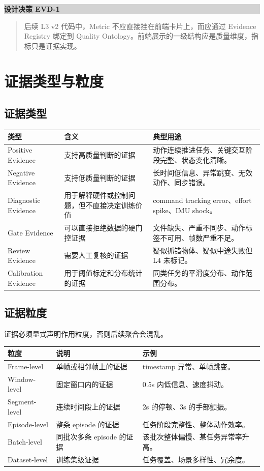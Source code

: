 \documentclass[UTF8,zihao=-4,oneside,openany]{ctexrep}
\newenvironment{decisionbox}[1]{\vspace{0.5em}\noindent\colorbox{LightGray}{\parbox{0.96\linewidth}{\textbf{#1}}}\par\vspace{-0.2em}\begin{quote}\small}{\end{quote}\vspace{0.3em}}
\begin{document}
\begin{decisionbox}{设计决策 EVD-1}
后续 L3 v2 代码中，Metric 不应直接挂在前端卡片上，而应通过 Evidence Registry 绑定到 Quality Ontology。前端展示的一级结构应是质量维度，指标只是证据实现。
\end{decisionbox}

\section{证据类型与粒度}

\subsection{证据类型}

\begin{longtable}{L{3cm} L{4.2cm} L{6.4cm}}
\toprule
类型 & 含义 & 典型用途 \\
\midrule
Positive Evidence & 支持高质量判断的证据 & 动作连续推进任务、关键交互阶段完整、状态变化清晰。 \\
Negative Evidence & 支持低质量判断的证据 & 长时间低信息、异常跳变、无效动作、同步错误。 \\
Diagnostic Evidence & 用于解释硬件或控制问题，但不直接决定训练价值 & command tracking error、effort spike、IMU shock。 \\
Gate Evidence & 可以直接拒绝数据的硬门控证据 & 文件缺失、严重不同步、动作标签不可用、帧数严重不足。 \\
Review Evidence & 需要人工复核的证据 & 疑似抓错物体、疑似中途失败但 L4 未标记。 \\
Calibration Evidence & 用于阈值标定和分布统计的证据 & 同类任务的平滑度分布、动作范围分布。 \\
\bottomrule
\end{longtable}

\subsection{证据粒度}

证据必须显式声明作用粒度，否则后续聚合会混乱。

\begin{longtable}{L{3cm} L{4.3cm} L{6.3cm}}
\toprule
粒度 & 说明 & 示例 \\
\midrule
Frame-level & 单帧或相邻帧上的证据 & timestamp 异常、单帧跳变。 \\
Window-level & 固定窗口内的证据 & 0.5s 内低信息、速度抖动。 \\
Segment-level & 连续时间段上的证据 & 2s 的停顿、3s 的手部颤振。 \\
Episode-level & 整条 episode 的证据 & 任务阶段完整性、整体动作效率。 \\
Batch-level & 同批次多条 episode 的证据 & 该批次整体偏慢、某任务异常率升高。 \\
Dataset-level & 训练集级证据 & 任务覆盖、场景多样性、冗余度。 \\
\bottomrule
\end{longtable}
\end{document}

